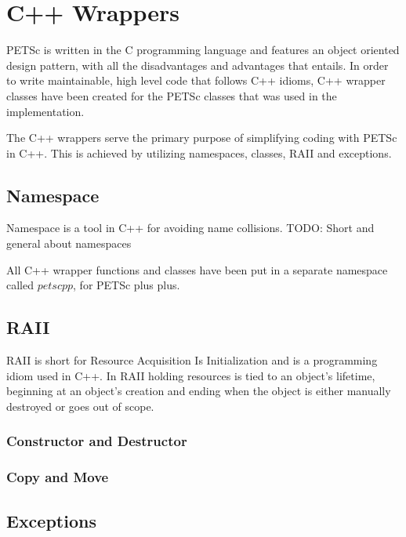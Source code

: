 \section{C++ Wrappers}

PETSc is written in the C programming language and features an object oriented
design pattern, with all the disadvantages and advantages that entails. In order
to write maintainable, high level code that follows C++ idioms, C++ wrapper
classes have been created for the PETSc classes that was used in the
implementation.

The C++ wrappers serve the primary purpose of simplifying coding with PETSc in
C++. This is achieved by utilizing namespaces, classes, RAII and exceptions.

\subsection{Namespace}

Namespace is a tool in C++ for avoiding name collisions.
TODO: Short and general about namespaces

All C++ wrapper functions and classes have been put in a separate namespace
called $petscpp$, for PETSc plus plus.

\subsection{RAII}

RAII is short for Resource Acquisition Is Initialization and is a programming
idiom used in C++. In RAII holding resources is tied to an object's lifetime,
beginning at an object's creation and ending when the object is either manually
destroyed or goes out of scope.

\subsubsection{Constructor and Destructor}



\subsubsection{Copy and Move}



\subsection{Exceptions}

